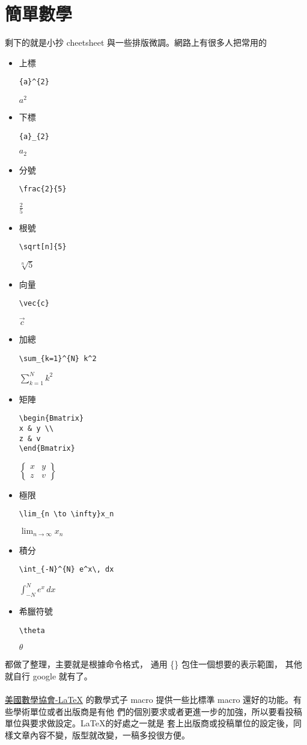 \section{簡單數學}
剩下的就是小抄 cheetsheet 與一些排版微調。網路上有很多人把常用的
  \begin{itemize}
    \item 上標
      \begin{verbatim}
{a}^{2}
      \end{verbatim}
      ${a}^{2}$
    \item 下標
      \begin{verbatim}
{a}_{2}
      \end{verbatim}
      ${a}_{2}$
    \item 分號
      \begin{verbatim}
\frac{2}{5}
      \end{verbatim}
      $\frac{2}{5}$
    \item 根號
      \begin{verbatim}
\sqrt[n]{5}
      \end{verbatim}
      $\sqrt[n]{5}$
    \item 向量
      \begin{verbatim}
\vec{c}
      \end{verbatim}
      $\vec{c}$
    \item 加總
      \begin{verbatim}
\sum_{k=1}^{N} k^2
      \end{verbatim}
      $\sum_{k=1}^{N} k^2$
    \item 矩陣
      \begin{verbatim}
\begin{Bmatrix}
x & y \\
z & v
\end{Bmatrix}
      \end{verbatim}
      $\begin{Bmatrix}
      x & y \\
      z & v
      \end{Bmatrix}$
    \item 極限
      \begin{verbatim}
\lim_{n \to \infty}x_n
      \end{verbatim}
      $\lim_{n \to \infty}x_n$
    \item 積分
      \begin{verbatim}
\int_{-N}^{N} e^x\, dx
      \end{verbatim}
      $\int_{-N}^{N} e^x\, dx$
    \item 希臘符號
      \begin{verbatim}
\theta
      \end{verbatim}
      $\theta$
  \end{itemize}
都做了整理，主要就是根據命令格式， 通用 \{\} 包住一個想要的表示範圍，
其他就自行 google 就有了。
\\\\
\href{https://www.ams.org/arc/tex/amsmath/amsldoc.pdf}{美國數學協會\AmS-\LaTeX}
的數學式子 macro 提供一些比標準 macro 還好的功能。有些學術單位或者出版商是有他
們的個別要求或者更進一步的加強，所以要看投稿單位與要求做設定。\LaTeX 的好處之一就是
套上出版商或投稿單位的設定後，同樣文章內容不變，版型就改變，一稿多投很方便。

